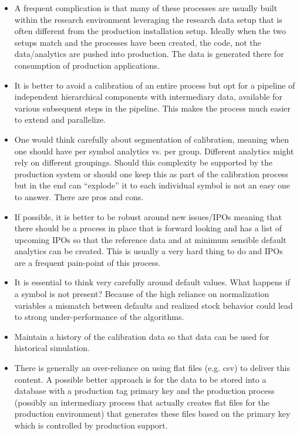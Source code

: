 \begin{itemize}
\item A frequent complication is that many of these processes are usually built within the research environment leveraging the research data setup that is often different from the production installation setup. Ideally when the two setups match and the processes have been created, the code, not the data/analytics are pushed into production. The data is generated there for consumption of production applications.

\item It is better to avoid a calibration of an entire process but opt for a pipeline of independent hierarchical components with intermediary data, available for various subsequent steps in the pipeline. This makes the process much easier to extend and parallelize. 

\item One would think carefully about segmentation of calibration, meaning when one should have per symbol analytics vs. per group. Different analytics might rely on different groupings. Should this complexity be supported by the production system or should one keep this as part of the calibration process but in the end can ``explode'' it to each individual symbol is not an easy one to answer. There are pros and cons.

\item If possible, it is better to be robust around new issues/IPOs meaning that there should be a process in place that is forward looking and has a list of upcoming IPOs so that the reference data and at minimum sensible default analytics can be created. This is usually a very hard thing to do and IPOs are a frequent pain-point of this process.

\item It is essential to think very carefully around default values. What happens if a symbol is not present? Because of the high reliance on normalization variables a mismatch between defaults and realized stock behavior could lead to strong under-performance of the algorithms.

\item Maintain a history of the calibration data so that data can be used for historical simulation.

\item There is generally an over-reliance on using flat files (e.g. csv) to deliver this content. A possible better approach is for the data to be stored into a database with a production tag primary key and the production process (possibly an intermediary process that actually creates flat files for the production environment) that generates these files based on the primary key which is controlled by production support. \label{in:calb2}
\end{itemize}



